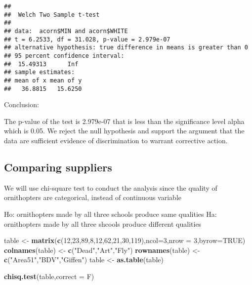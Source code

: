 \documentclass[]{article}
\newenvironment{Shaded}{\begin{snugshade}}{\end{snugshade}}
\newcommand{\KeywordTok}[1]{\textcolor[rgb]{0.13,0.29,0.53}{\textbf{#1}}}
\newcommand{\DataTypeTok}[1]{\textcolor[rgb]{0.13,0.29,0.53}{#1}}
\newcommand{\DecValTok}[1]{\textcolor[rgb]{0.00,0.00,0.81}{#1}}
\newcommand{\StringTok}[1]{\textcolor[rgb]{0.31,0.60,0.02}{#1}}
\newcommand{\OtherTok}[1]{\textcolor[rgb]{0.56,0.35,0.01}{#1}}
\newcommand{\OperatorTok}[1]{\textcolor[rgb]{0.81,0.36,0.00}{\textbf{#1}}}
\newcommand{\NormalTok}[1]{#1}
\begin{document}
\begin{Shaded}
\end{Shaded}

\begin{verbatim}
## 
##  Welch Two Sample t-test
## 
## data:  acorn$MIN and acorn$WHITE
## t = 6.2533, df = 31.028, p-value = 2.979e-07
## alternative hypothesis: true difference in means is greater than 0
## 95 percent confidence interval:
##  15.49313      Inf
## sample estimates:
## mean of x mean of y 
##   36.8815   15.6250
\end{verbatim}

Conclusion:

The p-value of the test is 2.979e-07 that is less than the significance
level alpha which is 0.05. We reject the null hypothesis and support the
argument that the data are sufficient evidence of discrimination to
warrant corrective action.

\subsection{Comparing suppliers}\label{comparing-suppliers}

We will use chi-square test to conduct the analysis since the quality of
ornithopters are categorical, instead of continuous variable

Ho: ornithopters made by all three schools produce same qualities Ha:
ornithopters made by all three shcools produce different qualities

\begin{Shaded}
\begin{Highlighting}[]
\NormalTok{table <-}\StringTok{ }\KeywordTok{matrix}\NormalTok{(}\KeywordTok{c}\NormalTok{(}\DecValTok{12}\NormalTok{,}\DecValTok{23}\NormalTok{,}\DecValTok{89}\NormalTok{,}\DecValTok{8}\NormalTok{,}\DecValTok{12}\NormalTok{,}\DecValTok{62}\NormalTok{,}\DecValTok{21}\NormalTok{,}\DecValTok{30}\NormalTok{,}\DecValTok{119}\NormalTok{),}\DataTypeTok{ncol=}\DecValTok{3}\NormalTok{,}\DataTypeTok{nrow =} \DecValTok{3}\NormalTok{,}\DataTypeTok{byrow=}\OtherTok{TRUE}\NormalTok{)}
\KeywordTok{colnames}\NormalTok{(table) <-}\StringTok{ }\KeywordTok{c}\NormalTok{(}\StringTok{"Dead"}\NormalTok{,}\StringTok{"Art"}\NormalTok{,}\StringTok{"Fly"}\NormalTok{)}
\KeywordTok{rownames}\NormalTok{(table) <-}\StringTok{ }\KeywordTok{c}\NormalTok{(}\StringTok{"Area51"}\NormalTok{,}\StringTok{"BDV"}\NormalTok{,}\StringTok{"Giffen"}\NormalTok{)}
\NormalTok{table <-}\StringTok{ }\KeywordTok{as.table}\NormalTok{(table)}

\KeywordTok{chisq.test}\NormalTok{(table,}\DataTypeTok{correct =}\NormalTok{ F)}
\end{Highlighting}
\end{Shaded}
\end{document}

